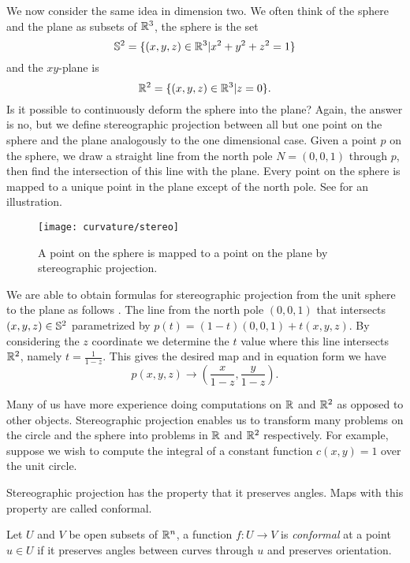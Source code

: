 We now consider the same idea in dimension two.
We often think of the sphere and the plane as subsets of $\mathbb{R}^3$,
the sphere is the set
$$\mathbb{S}^2=\{(x,y,z)\in \mathbb{R}^3 | x^2+y^2+z^2=1\}$$
and the $xy$-plane is
$$\mathbb{R}^2=\{(x,y,z)\in \mathbb{R}^3 | z=0\}.$$
Is it possible to continuously deform the sphere into the plane?
Again, the answer is no, but we define stereographic projection between all but one point
 on the sphere and the plane analogously to the one dimensional case.
 Given a point $p$ on the sphere, we draw a straight line
from the north pole $N=(0,0,1)$ through $p$, then find the intersection of
this line with the plane. Every point on the sphere is mapped
to a unique point in the plane except of the north pole.
See  for an illustration.





\begin{figure}[htb]
	\centering
	\texttt{[image: curvature/stereo]}
	\caption{A point on the sphere is mapped to a point on the plane by stereographic projection.}
	\label{fig:stereo1}
\end{figure}


We are able to obtain formulas for stereographic projection from
the unit sphere to the plane as follows \cite{christian-notes}.
The line from the north pole $(0,0,1)$ that intersects $(x,y,z)\in \mathbb{S}^2$ parametrized by 
$p(t)=(1-t)(0,0,1)+t(x,y,z)$. By considering the $z$ coordinate we determine the $t$ value where this line
intersects $\mathbb{R}^2$, namely $t=\frac{1}{1-z}.$
This gives the desired map  and in equation form we have
$$p(x,y,z)\to \left(\frac{x}{1-z},\frac{y}{1-z}\right).$$



Many of us have more experience doing computations on $\mathbb{R}$ and $\mathbb{R}^2$ as opposed
to other objects. Stereographic projection enables us to transform many problems on
the circle and the sphere into problems in $\mathbb{R}$ and $\mathbb{R}^2$ respectively.
For example, suppose we wish to compute the integral of a constant function
$c(x,y)=1$ over the unit circle. 

Stereographic projection has the property that it preserves angles.
Maps with this property are called conformal. 
\begin{definition}[Conformal]\label{def:conformal}
	Let $U$ and $V$ be open subsets of $\mathbb{R}^n$, a function $f:U\to V$ is
	\emph{conformal} at a point $u\in U$ if it preserves angles between curves
	through $u$ and preserves orientation.
\end{definition}

